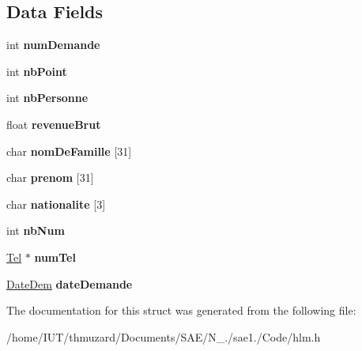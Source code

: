 \subsection*{Data Fields}
\begin{DoxyCompactItemize}
\item 
\mbox{\label{struct_menage_ac743b82b1da0e2bcf9ffaf0e9fd08034}} 
int {\bfseries num\+Demande}
\item 
\mbox{\label{struct_menage_a0dc3b51805d54678be1c7ab3eebfe35f}} 
int {\bfseries nb\+Point}
\item 
\mbox{\label{struct_menage_ae9237c6ce2605ffd02e67dd05202a6ff}} 
int {\bfseries nb\+Personne}
\item 
\mbox{\label{struct_menage_a783290410bb7ec687a5b660ea9f80708}} 
float {\bfseries revenue\+Brut}
\item 
\mbox{\label{struct_menage_a0fb012454f87cc4f6bf2e53440c51428}} 
char {\bfseries nom\+De\+Famille} \mbox{[}31\mbox{]}
\item 
\mbox{\label{struct_menage_ab12db00e8885e637d3ebd7b87adf564c}} 
char {\bfseries prenom} \mbox{[}31\mbox{]}
\item 
\mbox{\label{struct_menage_ad5bc5a64fd7ac927b2a45cd4dcf7af62}} 
char {\bfseries nationalite} \mbox{[}3\mbox{]}
\item 
\mbox{\label{struct_menage_a16a1079c7488fd3a6df04e542b01bf72}} 
int {\bfseries nb\+Num}
\item 
\mbox{\label{struct_menage_af6fcbb8b18e974fd8bca72a528955a51}} 
\hyperlink{struct_tel}{Tel} $\ast$ {\bfseries num\+Tel}
\item 
\mbox{\label{struct_menage_a4aa620f84fe6a8e15b9592f7075ef8e2}} 
\hyperlink{struct_date_dem}{Date\+Dem} {\bfseries date\+Demande}
\end{DoxyCompactItemize}


The documentation for this struct was generated from the following file\+:\begin{DoxyCompactItemize}
\item 
/home/\+I\+U\+T/thmuzard/\+Documents/\+S\+A\+E/\+N\+\_./sae1./\+Code/hlm.\+h\end{DoxyCompactItemize}
